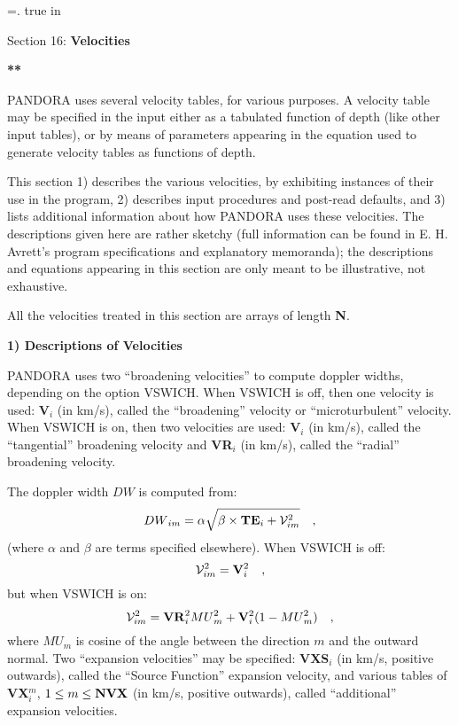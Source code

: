 %
\newtoks\footline \footline={\hss{}.\folio\hss}
%
%
\top
{} true in
\centerline{Section 16: {\bf Velocities}}
\blankline
\blankline
\centerline{\bf ***}
\blankline
\blankline
PANDORA uses several velocity tables, for various purposes. A velocity
\break table may be specified in the input either as a tabulated
function of depth (like other input tables), or by means of
parameters appearing in the equation used \break to generate velocity tables
as functions of depth.

This section 1) describes the various velocities, by exhibiting instances
of their use in the program, 2) describes input procedures and post-read defaults,
and 3) lists additional information about how PANDORA uses these velocities.
The descriptions given here are rather sketchy (full information can be
found in E. H. Avrett's program specifications and explanatory memoranda);
the descriptions and equations appearing in this section are only meant to
be illustrative, not exhaustive.

All the velocities treated in this section are arrays of length {\bf N}.
\ej
\centerline{{\bf 1) Descriptions of Velocities}}
\blankline
\blankline
{}
\blankline
PANDORA uses two ``broadening velocities'' to compute doppler widths, depending
on the option VSWICH. When VSWICH is off, then one velocity is used: {\bf V}$_i$
(in km/s), called the ``broadening'' velocity or ``microturbulent'' velocity.
When VSWICH is on, then two velocities are used: {\bf V}$_i$ (in km/s), called
the ``tangential'' broadening velocity and {\bf VR}$_i$ (in km/s), called the
``radial'' broadening velocity.

The doppler width ${DW}$ is computed from:
$$ {DW}_{im} = \alpha \sqrt{ \beta \times {\bf TE}_i + {\cal V}^2_{im}} \quad , $$
(where $\alpha$ and $\beta$ are terms specified elsewhere). When VSWICH is off:
$$ {\cal V}^2_{im} = {\bf V}^2_i \quad , $$
but when VSWICH is on:
$$ {\cal V}^2_{im} = {\bf VR}^2_i {MU}^2_m + {\bf V}^2_i (1 - {MU}^2_m) \quad , $$
where $MU_m$ is cosine of the angle between the direction $m$ and the outward 
normal.
\blankline
\blankline
{}
\blankline
Two ``expansion velocities'' may be specified: {\bf VXS}$_i$ (in km/s,
positive outwards), called the ``Source Function'' expansion velocity,
and various tables of {\bf VX}$^m_i$, $1 \leq m \leq {\bf NVX}$ (in km/s,
positive outwards), called ``additional'' expansion velocities. 

